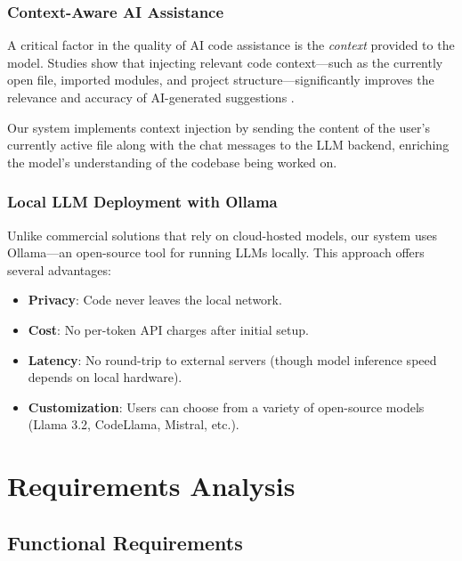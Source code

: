 \documentclass[12pt,a4paper,oneside]{report}
\begin{document}
\subsection{Context-Aware AI Assistance}

A critical factor in the quality of AI code assistance is the \textit{context} provided to the model. Studies show that injecting relevant code context---such as the currently open file, imported modules, and project structure---significantly improves the relevance and accuracy of AI-generated suggestions \cite{peng2023}.

Our system implements context injection by sending the content of the user's currently active file along with the chat messages to the LLM backend, enriching the model's understanding of the codebase being worked on.

\subsection{Local LLM Deployment with Ollama}

Unlike commercial solutions that rely on cloud-hosted models, our system uses Ollama---an open-source tool for running LLMs locally. This approach offers several advantages:

\begin{itemize}
    \item \textbf{Privacy}: Code never leaves the local network.
    \item \textbf{Cost}: No per-token API charges after initial setup.
    \item \textbf{Latency}: No round-trip to external servers (though model inference speed depends on local hardware).
    \item \textbf{Customization}: Users can choose from a variety of open-source models (Llama 3.2, CodeLlama, Mistral, etc.).
\end{itemize}


\chapter{Requirements Analysis}

\section{Functional Requirements}
\end{document}
